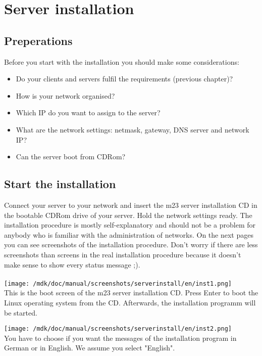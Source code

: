 \chapter{Server installation}
\section{Preperations}
Before you start with the installation you should make some considerations:
\begin{itemize}
\item Do your clients and servers fulfil the requirements (previous chapter)?
\item How is your network organised?
\item Which IP do you want to assign to the server?
\item What are the network settings: netmask, gateway, DNS server and network IP?
\item Can the server boot from CDRom?
\end{itemize}

\section{Start the installation}
Connect your server to your network and insert the m23 server installation CD in the bootable CDRom drive of your server. Hold the network settings ready. The installation procedure is mostly self-explanatory and should not be a problem for anybody who is familiar with the administration of networks. On the next pages you can see screenshots of the installation procedure. Don't worry if there are less screenshots than screens in the real installation procedure because it doesn't make sense to show every status message ;).\\\\

\texttt{[image: /mdk/doc/manual/screenshots/serverinstall/en/inst1.png]}\\
This is the boot screen of the m23 server installation CD. Press Enter to boot the Linux operating system from the CD. Afterwards, the installation programm will be started.



\texttt{[image: /mdk/doc/manual/screenshots/serverinstall/en/inst2.png]}\\
You have to choose if you want the messages of the installation program in German or in English. We assume you select "English".



